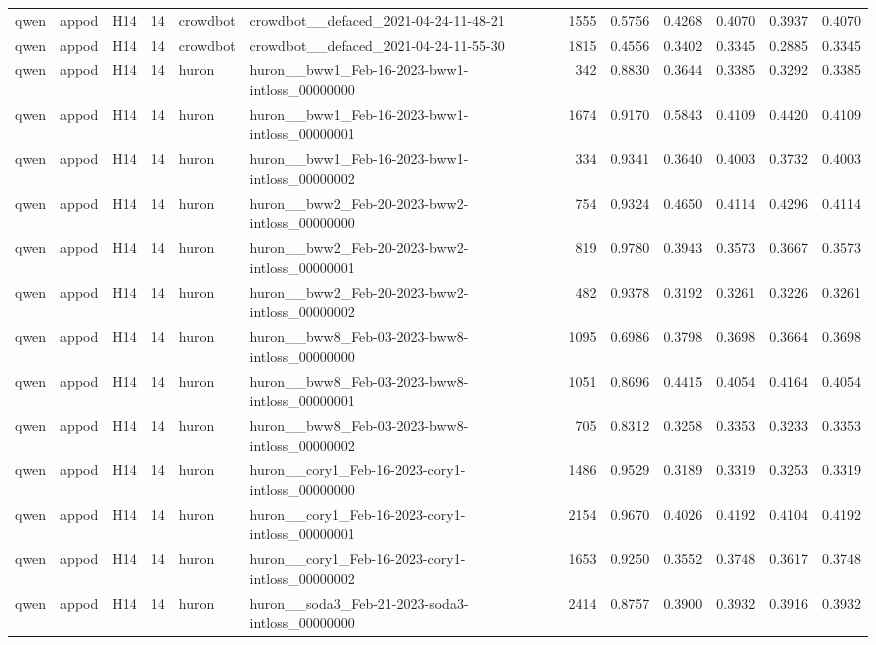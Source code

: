\begin{table}[tbp]
\begin{tabular}{lllrllrrrrrr}
qwen & appod & H14 & 14 & crowdbot & crowdbot\_\_defaced\_2021-04-24-11-48-21 & 1555 & 0.5756 & 0.4268 & 0.4070 & 0.3937 & 0.4070 \\
qwen & appod & H14 & 14 & crowdbot & crowdbot\_\_defaced\_2021-04-24-11-55-30 & 1815 & 0.4556 & 0.3402 & 0.3345 & 0.2885 & 0.3345 \\
qwen & appod & H14 & 14 & huron & huron\_\_bww1\_Feb-16-2023-bww1-intloss\_00000000 & 342 & 0.8830 & 0.3644 & 0.3385 & 0.3292 & 0.3385 \\
qwen & appod & H14 & 14 & huron & huron\_\_bww1\_Feb-16-2023-bww1-intloss\_00000001 & 1674 & 0.9170 & 0.5843 & 0.4109 & 0.4420 & 0.4109 \\
qwen & appod & H14 & 14 & huron & huron\_\_bww1\_Feb-16-2023-bww1-intloss\_00000002 & 334 & 0.9341 & 0.3640 & 0.4003 & 0.3732 & 0.4003 \\
qwen & appod & H14 & 14 & huron & huron\_\_bww2\_Feb-20-2023-bww2-intloss\_00000000 & 754 & 0.9324 & 0.4650 & 0.4114 & 0.4296 & 0.4114 \\
qwen & appod & H14 & 14 & huron & huron\_\_bww2\_Feb-20-2023-bww2-intloss\_00000001 & 819 & 0.9780 & 0.3943 & 0.3573 & 0.3667 & 0.3573 \\
qwen & appod & H14 & 14 & huron & huron\_\_bww2\_Feb-20-2023-bww2-intloss\_00000002 & 482 & 0.9378 & 0.3192 & 0.3261 & 0.3226 & 0.3261 \\
qwen & appod & H14 & 14 & huron & huron\_\_bww8\_Feb-03-2023-bww8-intloss\_00000000 & 1095 & 0.6986 & 0.3798 & 0.3698 & 0.3664 & 0.3698 \\
qwen & appod & H14 & 14 & huron & huron\_\_bww8\_Feb-03-2023-bww8-intloss\_00000001 & 1051 & 0.8696 & 0.4415 & 0.4054 & 0.4164 & 0.4054 \\
qwen & appod & H14 & 14 & huron & huron\_\_bww8\_Feb-03-2023-bww8-intloss\_00000002 & 705 & 0.8312 & 0.3258 & 0.3353 & 0.3233 & 0.3353 \\
qwen & appod & H14 & 14 & huron & huron\_\_cory1\_Feb-16-2023-cory1-intloss\_00000000 & 1486 & 0.9529 & 0.3189 & 0.3319 & 0.3253 & 0.3319 \\
qwen & appod & H14 & 14 & huron & huron\_\_cory1\_Feb-16-2023-cory1-intloss\_00000001 & 2154 & 0.9670 & 0.4026 & 0.4192 & 0.4104 & 0.4192 \\
qwen & appod & H14 & 14 & huron & huron\_\_cory1\_Feb-16-2023-cory1-intloss\_00000002 & 1653 & 0.9250 & 0.3552 & 0.3748 & 0.3617 & 0.3748 \\
qwen & appod & H14 & 14 & huron & huron\_\_soda3\_Feb-21-2023-soda3-intloss\_00000000 & 2414 & 0.8757 & 0.3900 & 0.3932 & 0.3916 & 0.3932 \\

\end{tabular}
\end{table}

